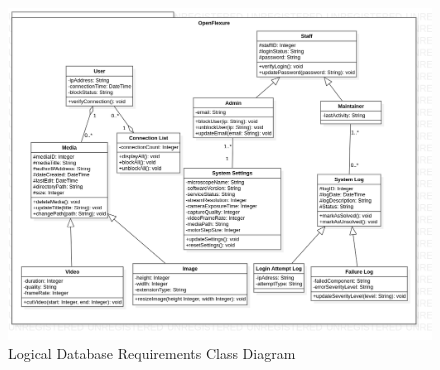 \begin{figure}[H]
	\centering
	\includegraphics[scale=0.4]{Uml_Images/logical_db_class_diagram}
	\caption{Logical Database Requirements Class Diagram}
	\label{fig:logical_db_class_diagram}
\end{figure}

